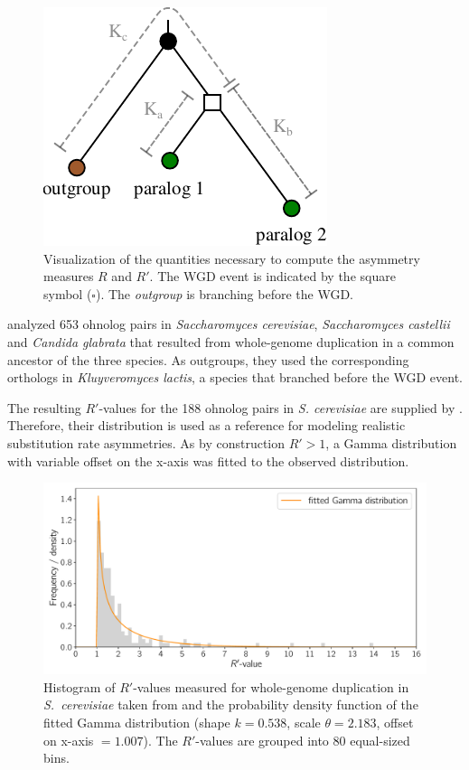 \documentclass[hidelinks,11pt]{scrreprt}
\begin{document}
\vspace{5mm}
\begin{figure}[ht]
	\begin{center}     
		\includegraphics[width=0.4\columnwidth]{WGD_lengths.pdf}
	\end{center}
	\caption[Visualization of the asymmetry measures $R$ and $R'$]{Visualization of the quantities necessary to compute the asymmetry measures $R$ and $R'$. The WGD event is indicated by the square symbol ($\square$). The \textit{outgroup} is branching before the WGD.}
	\label{fig:wgd_lengths}
\end{figure}

\citet{byrne2007} analyzed 653 ohnolog
pairs in \textit{Saccharomyces cerevisiae}, \textit{Saccharomyces castellii} and \textit{Candida glabrata} that resulted from whole-genome duplication in a common ancestor of the three species. As outgroups, they used the corresponding orthologs in \textit{Kluyveromyces lactis}, a species that branched before the WGD event.

The resulting $R'$-values for the 188 ohnolog pairs in \textit{S. cerevisiae} are supplied by \citet{byrne2007}. Therefore, their distribution is used as a reference for modeling realistic substitution rate asymmetries. As by construction $R'>1$, a Gamma distribution with variable offset on the x-axis was fitted to the observed distribution. 

\begin{figure}[ht]
	\begin{center}     
		\includegraphics[width=\columnwidth]{WGD_histogram.pdf}
	\end{center}
	\caption[Histogram of $R'$-values measured for whole-genome duplication in \textit{S.~cerevisiae}]{Histogram of $R'$-values measured for whole-genome duplication in \textit{S.~cerevisiae} taken from \citet{byrne2007} and the probability density function of the fitted Gamma distribution (shape $k=0.538$, scale $\theta=2.183$, offset on x-axis $=1.007$). The $R'$-values are grouped into 80 equal-sized bins.}
	\label{fig:wgd_histogram}
\end{figure}
\end{document}
